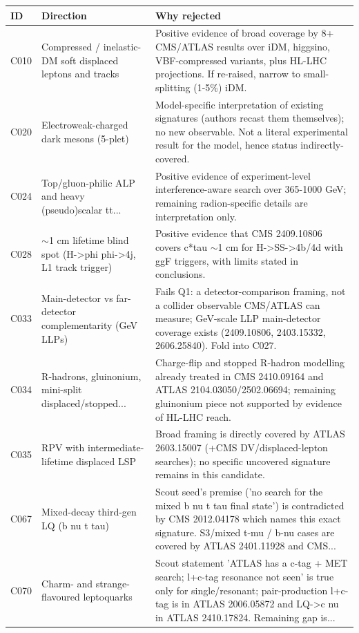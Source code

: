 \documentclass[11pt,a4paper]{article}
\begin{document}
\begin{center}\footnotesize\begin{tabular}{@{}l p{4.3cm} p{8cm}@{}}\toprule ID & Direction & Why rejected\\\midrule
C010 & Compressed / inelastic-DM soft displaced leptons and tracks & Positive evidence of broad coverage by 8+ CMS/ATLAS results over iDM, higgsino, VBF-compressed variants, plus HL-LHC projections. If re-raised, narrow to small-splitting (1-5\%) iDM.\\
C020 & Electroweak-charged dark mesons (5-plet) & Model-specific interpretation of existing signatures (authors recast them themselves); no new observable. Not a literal experimental result for the model, hence status indirectly-covered.\\
C024 & Top/gluon-philic ALP and heavy (pseudo)scalar tt... & Positive evidence of experiment-level interference-aware search over 365-1000 GeV; remaining radion-specific details are interpretation only.\\
C028 & $\sim$1 cm lifetime blind spot (H->phi phi->4j, L1 track trigger) & Positive evidence that CMS 2409.10806 covers c*tau $\sim$1 cm for H->SS->4b/4d with ggF triggers, with limits stated in conclusions.\\
C033 & Main-detector vs far-detector complementarity (GeV LLPs) & Fails Q1: a detector-comparison framing, not a collider observable CMS/ATLAS can measure; GeV-scale LLP main-detector coverage exists (2409.10806, 2403.15332, 2606.25840). Fold into C027.\\
C034 & R-hadrons, gluinonium, mini-split displaced/stopped... & Charge-flip and stopped R-hadron modelling already treated in CMS 2410.09164 and ATLAS 2104.03050/2502.06694; remaining gluinonium piece not supported by evidence of HL-LHC reach.\\
C035 & RPV with intermediate-lifetime displaced LSP & Broad framing is directly covered by ATLAS 2603.15007 (+CMS DV/displaced-lepton searches); no specific uncovered signature remains in this candidate.\\
C067 & Mixed-decay third-gen LQ (b nu t tau) & Scout seed's premise ('no search for the mixed b nu t tau final state') is contradicted by CMS 2012.04178 which names this exact signature. S3/mixed t-mu / b-nu cases are covered by ATLAS 2401.11928 and CMS...\\
C070 & Charm- and strange-flavoured leptoquarks & Scout statement 'ATLAS has a c-tag + MET search; l+c-tag resonance not seen' is true only for single/resonant; pair-production l+c-tag is in ATLAS 2006.05872 and LQ->c nu in ATLAS 2410.17824. Remaining gap is...\\

\end{tabular}
\end{center}
\end{document}
